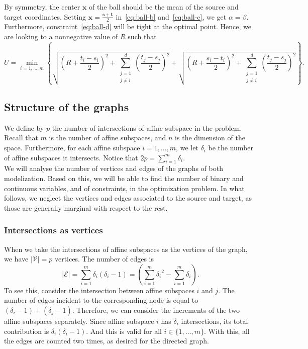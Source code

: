 \documentclass[a4paper, 12pt]{article}
\begin{document}
By symmetry, the center $\mathbf{x}$ of the ball should be the mean of the source and target coordinates. Setting $\mathbf{x} = \frac{\mathbf{s} + \mathbf{t}}{2}$ in~\ref{eq:ball-b} and~\ref{eq:ball-c}, we get $\alpha = \beta$. Furthermore, constraint~\ref{eq:ball-d} will be tight at the optimal point. Hence, we are looking to a nonnegative value of $R$ such that \[U = \min_{i=1, \dots,  m} \left\{ \sqrt{{\left(R + \frac{t_i - s_i}{2}\right)}^2 + \sum_{\substack{j=1 \\ j \neq i}}^{d} {\left(\frac{t_j - s_j}{2}\right)}^2} + \sqrt{{\left(R + \frac{s_i - t_i}{2}\right)}^2 + \sum_{\substack{j=1 \\ j \neq i}}^{d} {\left(\frac{t_j - s_j}{2}\right)}^2}\right\}.\]

\subsection{Structure of the graphs}
We define by $p$ the number of intersections of affine subspace in the problem. Recall that $m$ is the number of affine subspaces, and $n$ is the dimension of the space. Furthermore, for each affine subspace $i = 1, \dots, m$, we let $\delta_i$ be the number of affine subspaces it intersects. Notice that $2p = \sum_{i=1}^m \delta_i$.\\
We will analyse the number of vertices and edges of the graphs of both modelization. Based on this, we will be able to find the number of binary and continuous variables, and of constraints, in the optimization problem. In what follows, we neglect the vertices and edges associated to the source and target, as those are generally marginal with respect to the rest.

\subsubsection{Intersections as vertices}
When we take the intersections of affine subspaces as the vertices of the graph, we have $|\mathcal{V}| = p$ vertices. The number of edges is \[|\mathcal{E}| = \sum_{i=1}^m \delta_i (\delta_i - 1) = \left(\sum_{i=1}^m {\delta_i}^2 - \sum_{i=1}^m \delta_i\right).\] To see this, consider the intersection between affine subspaces $i$ and $j$. The number of edges incident to the corresponding node is equal to $(\delta_i - 1) + (\delta_j - 1)$. Therefore, we can consider the increments of the two affine subspaces separately. Since affine subspace $i$ has $\delta_i$ intersections, its total contribution is $\delta_i (\delta_i - 1)$. And this is valid for all $i \in \{1, \dots, m\}$. With this, all the edges are counted two times, as desired for the directed graph.
\end{document}
